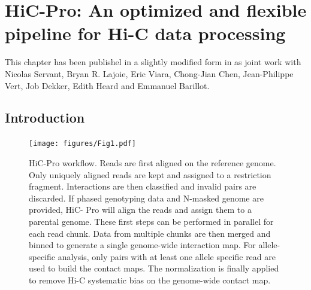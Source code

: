 
\chapter{HiC-Pro: An optimized and flexible pipeline for Hi-C data
processing}
\label{chap:hicpro}
\graphicspath{{10_hicpro/}}

\begin{work}

This chapter has been publishel in a slightly modified form in
\citep{servant:hic-pro} as joint work with
Nicolas Servant, Bryan R. Lajoie, Eric Viara, Chong-Jian Chen, Jean-Philippe
Vert, Job Dekker, Edith Heard and Emmanuel Barillot.

\end{work}

\begin{abstract}{Abstract}

HiC-Pro is an optimized and flexible pipeline for processing Hi-C data from
raw reads to normalized contact maps. HiC-Pro maps reads, detects valid
ligation products, performs quality controls and generates intra and
inter-chromosomal contact maps. It includes a fast implementation of the
iterative correction method and is based on a memory-efficient data format for
Hi-C contact maps. In addition, HiC-Pro can use phased genotype data to build
allele-specific contact maps. We applied HiC-Pro on different Hi-C dataset
demonstrating its ability to easily process large data in a reasonable time.
Source code and documentation are available at
\href{http://github.com/nservant/HiC-Pro.Introduction}{
http://github.com/nservant/HiC-Pro.Introduction}
\end{abstract}

\section{Introduction}

\begin{figure}
\texttt{[image: figures/Fig1.pdf]}
\caption{HiC-Pro workflow. Reads are first aligned on the reference genome.
Only uniquely aligned reads are kept and assigned to a restriction fragment.
Interactions are then classified and invalid pairs are discarded. If phased
genotyping data and N-masked genome are provided, HiC- Pro will align the
reads and assign them to a parental genome. These first steps can be performed
in parallel for each read chunk. Data from multiple chunks are then merged and
binned to generate a single genome-wide interaction map. For allele-specific
analysis, only pairs with at least one allele specific read are used to build
the contact maps. The normalization is finally applied to remove Hi-C
systematic bias on the genome-wide contact map.}
\label{fig:fig1}
\end{figure}


